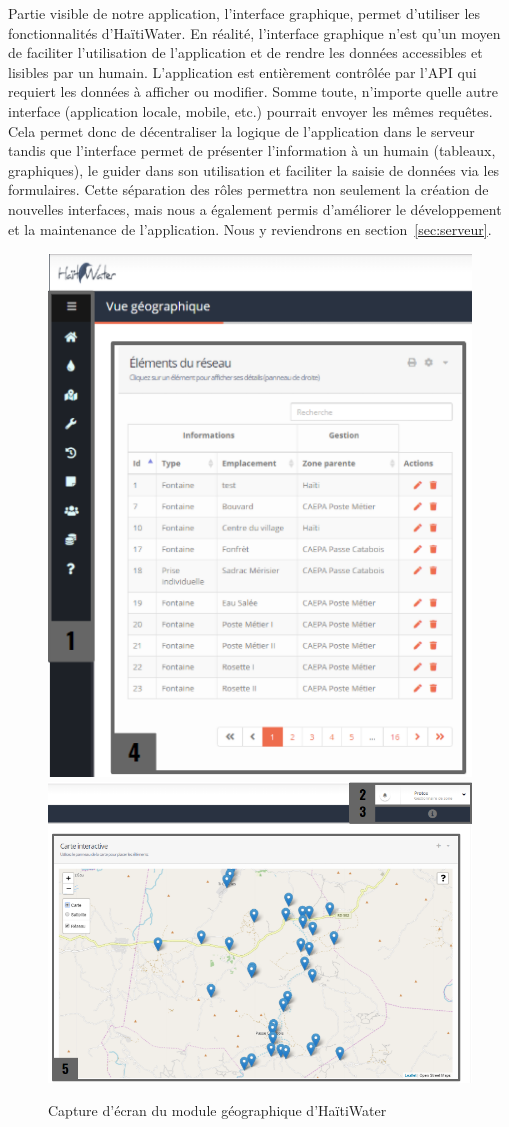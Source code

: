 \documentclass{EPL-master-thesis-covers-FR}
\begin{document}
			Partie visible de notre application, l'interface graphique, permet d'utiliser les fonctionnalités d'HaïtiWater. En réalité, l'interface graphique n'est qu'un moyen de faciliter l'utilisation de l'application et de rendre les données accessibles et lisibles par un humain. L'application est entièrement contrôlée par l'API qui requiert les données à afficher ou modifier. Somme toute, n'importe quelle autre interface (application locale, mobile, etc.) pourrait envoyer les mêmes requêtes. Cela permet donc de décentraliser la logique de l'application dans le serveur tandis que l'interface permet de présenter l'information à un humain (tableaux, graphiques), le guider dans son utilisation et faciliter la saisie de données via les formulaires. Cette séparation des rôles permettra non seulement la création de nouvelles interfaces, mais nous a également permis d'améliorer le développement et la maintenance de l'application. Nous y reviendrons en section~\ref{sec:serveur}.

			\begin{figure}[p]
				\centering
				\includegraphics[width=.6\textwidth]{images/screen_gis_numbered_1.png}
				\vfill
				\includegraphics[width=\textwidth]{images/screen_gis_numbered_2.png}
				\caption{Capture d'écran du module géographique d'HaïtiWater}
				\label{fig:capture_gis}
			\end{figure}
\end{document}
